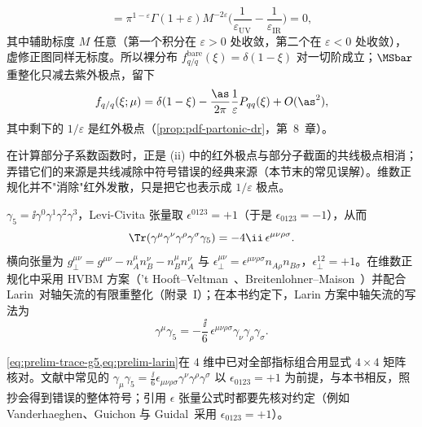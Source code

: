 \begin{example}
\begin{equation}
=\pi^{1-\varepsilon}\Gamma(1+\varepsilon)M^{-2\varepsilon}\Big(\frac1{\varepsilon_{\mathrm{UV}}}-\frac1{\varepsilon_{\mathrm{IR}}}\Big)=0, %
\end{equation}
其中辅助标度 $M$ 任意（第一个积分在 $\varepsilon>0$ 处收敛，第二个在 $\varepsilon<0$ 处收敛），虚修正图同样无标度。所以裸分布 $f^{\mathrm{bare}}_{q/q}(\xi)=\delta(1-\xi)$ 对一切阶成立；$\MSbar$ 重整化只减去紫外极点，留下
\[
f_{q/q}(\xi;\mu)=\delta(1-\xi)-\frac{\as}{2\pi}\frac1\varepsilon P_{qq}(\xi)+O(\as^2),
\]
其中剩下的 $1/\varepsilon$ 是红外极点（\cref{prop:pdf-partonic-dr}，第~8~章）。
\end{example}

在计算部分子系数函数时，正是 (ii) 中的红外极点与部分子截面的共线极点相消；弄错它们的来源是共线减除中符号错误的经典来源（本节末的常见误解）。维数正规化并不"消除"红外发散，只是把它也表示成 $1/\varepsilon$ 极点。

\begin{definition}\label{def:prelim-gamma5}
$\gamma_5=\ii\gamma^0\gamma^1\gamma^2\gamma^3$，Levi-Civita 张量取 $\epsilon^{0123}=+1$（于是 $\epsilon_{0123}=-1$），从而
\begin{equation}\label{eq:prelim-trace-g5}
\Tr(\gamma^\mu\gamma^\nu\gamma^\rho\gamma^\sigma\gamma_5)=-4\ii\,\epsilon^{\mu\nu\rho\sigma}. %
\end{equation}
横向张量为 $g_\perp^{\mu\nu}=g^{\mu\nu}-n_A^\mu n_B^\nu-n_B^\mu n_A^\nu$ 与 $\epsilon_\perp^{\mu\nu}=\epsilon^{\mu\nu\rho\sigma}n_{A\rho}n_{B\sigma}$，$\epsilon_\perp^{12}=+1$。在维数正规化中采用 HVBM 方案（'t Hooft--Veltman~\cite{tHooftVeltman1972}、Breitenlohner--Maison~\cite{BreitenlohnerMaison1977a}）并配合 Larin~\cite{Larin:1993tq}对轴矢流的有限重整化（附录~I）；在本书约定下，Larin 方案中轴矢流的写法为
\begin{equation}\label{eq:prelim-larin}
\gamma^\mu\gamma_5=-\frac{\ii}{6}\,\epsilon^{\mu\nu\rho\sigma}\gamma_\nu\gamma_\rho\gamma_\sigma . %
\end{equation}
\end{definition}

\cref{eq:prelim-trace-g5,eq:prelim-larin}在 $4$ 维中已对全部指标组合用显式 $4\times4$ 矩阵核对。文献中常见的 $\gamma_\mu\gamma_5=\frac{\ii}{6}\epsilon_{\mu\nu\rho\sigma}\gamma^\nu\gamma^\rho\gamma^\sigma$ 以 $\epsilon_{0123}=+1$ 为前提，与本书相反，照抄会得到错误的整体符号；引用 $\epsilon$ 张量公式时都要先核对约定（例如 Vanderhaeghen、Guichon 与 Guidal~\cite{Vanderhaeghen:1999xj}采用 $\epsilon_{0123}=+1$）。
